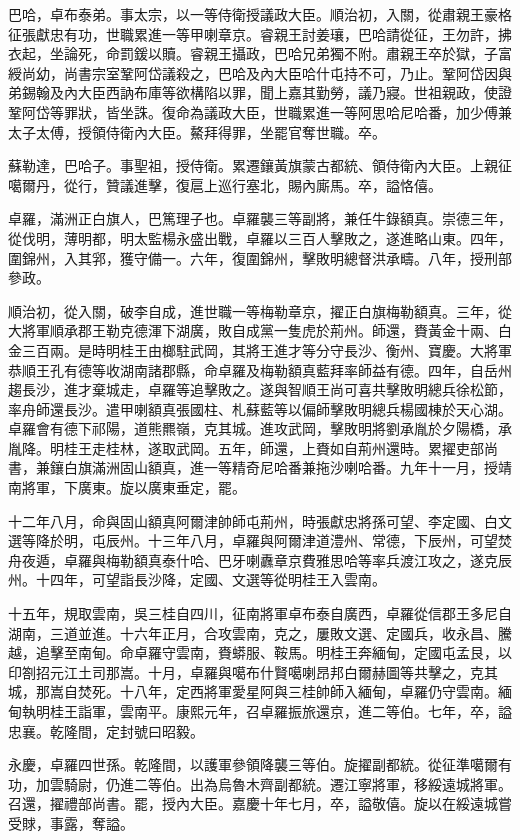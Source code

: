\begin{pinyinscope}
巴哈，卓布泰弟。事太宗，以一等侍衛授議政大臣。順治初，入關，從肅親王豪格征張獻忠有功，世職累進一等甲喇章京。睿親王討姜瓖，巴哈請從征，王勿許，拂衣起，坐論死，命罰鍰以贖。睿親王攝政，巴哈兄弟獨不附。肅親王卒於獄，子富綬尚幼，尚書宗室鞏阿岱議殺之，巴哈及內大臣哈什屯持不可，乃止。鞏阿岱因與弟錫翰及內大臣西訥布庫等欲構陷以罪，聞上嘉其勤勞，議乃寢。世祖親政，使證鞏阿岱等罪狀，皆坐誅。復命為議政大臣，世職累進一等阿思哈尼哈番，加少傅兼太子太傅，授領侍衛內大臣。鰲拜得罪，坐罷官奪世職。卒。

蘇勒達，巴哈子。事聖祖，授侍衛。累遷鑲黃旗蒙古都統、領侍衛內大臣。上親征噶爾丹，從行，贊議進擊，復扈上巡行塞北，賜內廝馬。卒，謚恪僖。

卓羅，滿洲正白旗人，巴篤理子也。卓羅襲三等副將，兼任牛錄額真。崇德三年，從伐明，薄明都，明太監楊永盛出戰，卓羅以三百人擊敗之，遂進略山東。四年，圍錦州，入其郛，獲守備一。六年，復圍錦州，擊敗明總督洪承疇。八年，授刑部參政。

順治初，從入關，破李自成，進世職一等梅勒章京，擢正白旗梅勒額真。三年，從大將軍順承郡王勒克德渾下湖廣，敗自成黨一隻虎於荊州。師還，賚黃金十兩、白金三百兩。是時明桂王由榔駐武岡，其將王進才等分守長沙、衡州、寶慶。大將軍恭順王孔有德等收湖南諸郡縣，命卓羅及梅勒額真藍拜率師益有德。四年，自岳州趨長沙，進才棄城走，卓羅等追擊敗之。遂與智順王尚可喜共擊敗明總兵徐松節，率舟師還長沙。遣甲喇額真張國柱、札蘇藍等以偏師擊敗明總兵楊國棟於天心湖。卓羅會有德下祁陽，道熊羆嶺，克其城。進攻武岡，擊敗明將劉承胤於夕陽橋，承胤降。明桂王走桂林，遂取武岡。五年，師還，上賚如自荊州還時。累擢吏部尚書，兼鑲白旗滿洲固山額真，進一等精奇尼哈番兼拖沙喇哈番。九年十一月，授靖南將軍，下廣東。旋以廣東垂定，罷。

十二年八月，命與固山額真阿爾津帥師屯荊州，時張獻忠將孫可望、李定國、白文選等降於明，屯辰州。十三年八月，卓羅與阿爾津道澧州、常德，下辰州，可望焚舟夜遁，卓羅與梅勒額真泰什哈、巴牙喇纛章京費雅思哈等率兵渡江攻之，遂克辰州。十四年，可望詣長沙降，定國、文選等從明桂王入雲南。

十五年，規取雲南，吳三桂自四川，征南將軍卓布泰自廣西，卓羅從信郡王多尼自湖南，三道並進。十六年正月，合攻雲南，克之，屢敗文選、定國兵，收永昌、騰越，追擊至南甸。命卓羅守雲南，賚蟒服、鞍馬。明桂王奔緬甸，定國屯孟艮，以印劄招元江土司那嵩。十月，卓羅與噶布什賢噶喇昂邦白爾赫圖等共擊之，克其城，那嵩自焚死。十八年，定西將軍愛星阿與三桂帥師入緬甸，卓羅仍守雲南。緬甸執明桂王詣軍，雲南平。康熙元年，召卓羅振旅還京，進二等伯。七年，卒，謚忠襄。乾隆間，定封號曰昭毅。

永慶，卓羅四世孫。乾隆間，以護軍參領降襲三等伯。旋擢副都統。從征準噶爾有功，加雲騎尉，仍進二等伯。出為烏魯木齊副都統。遷江寧將軍，移綏遠城將軍。召還，擢禮部尚書。罷，授內大臣。嘉慶十年七月，卒，謚敬僖。旋以在綏遠城嘗受賕，事露，奪謚。


\end{pinyinscope}
